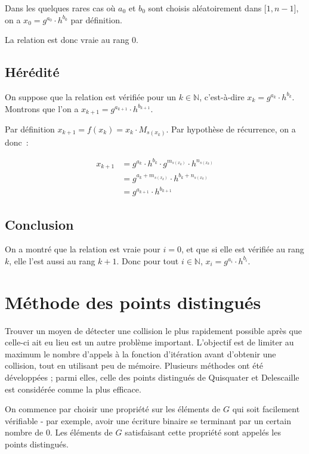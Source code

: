         Dans les quelques rares cas où $a_0$ et $b_0$ sont choisis aléatoirement dans $\mathopen{[}1,n-1\mathclose{]}$, on a $x_0 = g^{a_0} \cdot h^{b_0}$ par définition.

        La relation est donc vraie au rang $0$.

        \subsection*{Hérédité}
        On suppose que la relation est vérifiée pour un $k \in \mathbb{N}$, c'est-à-dire $x_k = g^{a_k} \cdot h^{b_k}$. Montrons que l'on a $x_{k+1} = g^{a_{k+1}} \cdot h^{b_{k+1}}$.

        Par définition $x_{k+1} = f(x_k) = x_k \cdot M_{s(x_k)}$. Par hypothèse de récurrence, on a donc~:

       \begin{align*}
          x_{k+1} &= g^{a_k} \cdot h^{b_k} \cdot g^{m_{s(x_k)}} \cdot h^{n_{s(x_k)}} \\
                  &= g^{a_k + m_{s(x_k)}} \cdot h^{b_k + n_{s(x_k)}} \\
                  &=g^{a_{k+1}} \cdot h^{b_{k+1}}
        \end{align*}

        \subsection*{Conclusion}
        On a montré que la relation est vraie pour $i = 0$, et que si elle est vérifiée au rang $k$, elle l'est aussi au rang $k + 1$. Donc pour tout $i \in \mathbb{N}$, $x_i = g^{a_i} \cdot h^{b_i}$.

        \section{Méthode des points distingués}
        Trouver un moyen de détecter une collision le plus rapidement possible après que celle-ci ait eu lieu est un autre problème important. L'objectif est de limiter au maximum le nombre d'appels à la fonction d'itération avant d'obtenir une collision, tout en utilisant peu de mémoire. Plusieurs méthodes ont été développées ; parmi elles, celle des points distingués de Quisquater et Delescaille est considérée comme la plus efficace.

        On commence par choisir une propriété sur les éléments de $G$ qui soit facilement vérifiable - par exemple, avoir une écriture binaire se terminant par un certain nombre de $0$. Les éléments de $G$ satisfaisant cette propriété sont appelés les points distingués.

